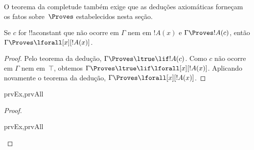 \documentclass[../../../include/open-logic-section]{subfiles}
\begin{document}


\begin{explain}
  O teorema da completude também exige que as deduções axiomáticas
  forneçam os fatos sobre~$\Proves$ estabelecidos nesta seção.
\end{explain}

\begin{thm}
 Se $c$ for !!a{constant} que não ocorre
em $\Gamma$ nem em $!A(x)$ e $\Gamma \Proves !A(c)$, então $\Gamma
\Proves \lforall[x][!A(x)]$.
\end{thm}

\begin{proof}
Pelo teorema da dedução, $\Gamma \Proves \ltrue \lif !A(c)$. Como
$c$ não ocorre em $\Gamma$ nem em~$\top$, obtemos $\Gamma \Proves
\ltrue \lif \lforall[x][!A(x)]$. Aplicando novamente o teorema da dedução, $\Gamma \Proves
\lforall[x][!A(x)]$.
\end{proof}

\begin{prop}
\begin{tagenumerate}{prvEx,prvAll}

\end{tagenumerate}
\end{prop}

\begin{proof}
\begin{tagenumerate}{prvEx,prvAll}
\end{tagenumerate}
\end{proof}
\end{document}
